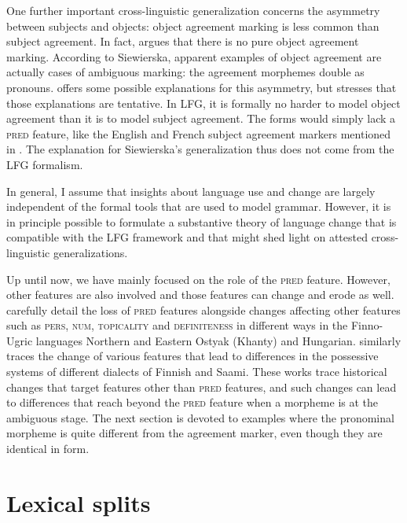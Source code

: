\documentclass[output=paper,hidelinks]{langscibook}
\begin{document}
 
 One further important cross-linguistic generalization concerns the asymmetry between subjects and objects: object agreement marking is less common than subject agreement.  In fact, \citet{siewierska99} argues that there is no pure object agreement marking.  According to Siewierska,   apparent examples  of object agreement    are actually   cases of ambiguous marking: the agreement morphemes double as pronouns. \citet{siewierska99} offers some possible explanations for this asymmetry,  but stresses that those explanations are tentative.   In LFG, it  is  formally  no harder to model object agreement than it is to model subject agreement.  The forms  would simply  lack a \textsc{pred} feature, like the English and French subject agreement markers mentioned in .  The explanation for Siewierska's generalization thus does not come from the LFG formalism.   
 
 In general, I assume that insights  about language use and change are largely independent of the formal tools  that are used to model grammar.  However,  it  is  in principle  possible  to formulate a substantive theory  of language change that is compatible with the LFG framework and  that might shed light on    attested cross-linguistic generalizations.  
 
 
Up until now, we have mainly  focused on the role of the \textsc{pred} feature. However, other features are also involved and those features can change and erode as well.  \citet{CoppockWechsler2010} carefully detail the loss of \textsc{pred}  features alongside changes affecting  other features such as \textsc{pers, num, topicality} and \textsc{definiteness} in different ways in the Finno-Ugric languages Northern and Eastern Ostyak (Khanty) and Hungarian. \citet{Toivonen2001b} similarly traces the change of various features that lead to differences in the possessive systems of different dialects of Finnish and Saami.  These works trace historical changes that  target features other than \textsc{pred} features, and such changes can lead to differences  that reach beyond the \textsc{pred} feature when a morpheme is at the ambiguous stage.  The next section is devoted to examples  where the  pronominal morpheme is quite different from the agreement marker, even though they are identical in form. 
 
 



\section{Lexical splits} \label{sec:splits}
\end{document}
